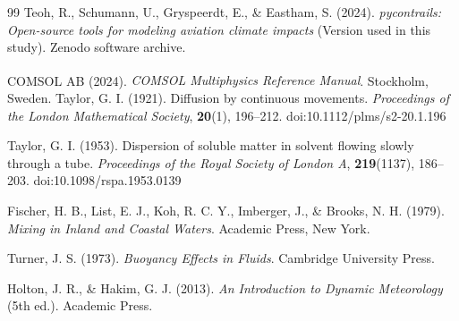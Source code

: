 \documentclass[11pt]{article}
\begin{document}
\begin{thebibliography}{99}
Teoh, R., Schumann, U., Gryspeerdt, E., \& Eastham, S. (2024).
\emph{pycontrails: Open-source tools for modeling aviation climate impacts}
(Version used in this study).
Zenodo software archive.

COMSOL AB (2024).
\emph{COMSOL Multiphysics\textsuperscript{\textregistered} Reference Manual}.
Stockholm, Sweden.
Taylor, G. I. (1921).
Diffusion by continuous movements.
\emph{Proceedings of the London Mathematical Society}, \textbf{20}(1), 196--212.
doi:10.1112/plms/s2-20.1.196

Taylor, G. I. (1953).
Dispersion of soluble matter in solvent flowing slowly through a tube.
\emph{Proceedings of the Royal Society of London A},
\textbf{219}(1137), 186--203.
doi:10.1098/rspa.1953.0139

Fischer, H. B., List, E. J., Koh, R. C. Y., Imberger, J., \& Brooks, N. H. (1979).
\emph{Mixing in Inland and Coastal Waters}.
Academic Press, New York.

Turner, J. S. (1973).
\emph{Buoyancy Effects in Fluids}.
Cambridge University Press.

Holton, J. R., \& Hakim, G. J. (2013).
\emph{An Introduction to Dynamic Meteorology} (5th ed.).
Academic Press.

\end{thebibliography}
\end{document}
